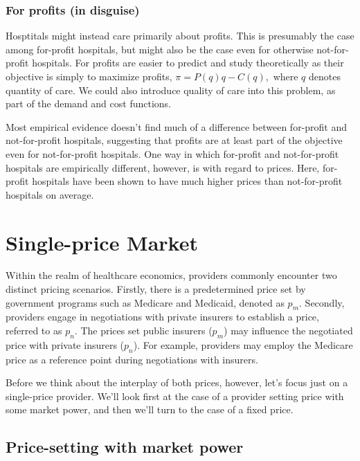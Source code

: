 \documentclass[
  letterpaper,
  DIV=11,
  numbers=noendperiod]{scrreport}
\theoremstyle{definition}
\theoremstyle{remark}
\begin{document}
\hypertarget{for-profits-in-disguise}{%
\subsection*{For profits (in disguise)}\label{for-profits-in-disguise}}

Hosptitals might instead care primarily about profits. This is
presumably the case among for-profit hospitals, but might also be the
case even for otherwise not-for-profit hospitals. For profits are easier
to predict and study theoretically as their objective is simply to
maximize profits, \(\pi=P(q)q - C(q),\) where \(q\) denotes quantity of
care. We could also introduce quality of care into this problem, as part
of the demand and cost functions.

Most empirical evidence doesn't find much of a difference between
for-profit and not-for-profit hospitals, suggesting that profits are at
least part of the objective even for not-for-profit hospitals. One way
in which for-profit and not-for-profit hospitals are empirically
different, however, is with regard to prices. Here, for-profit hospitals
have been shown to have much higher prices than not-for-profit hospitals
on average.

\hypertarget{single-price-market}{%
\chapter{Single-price Market}\label{single-price-market}}

Within the realm of healthcare economics, providers commonly encounter
two distinct pricing scenarios. Firstly, there is a predetermined price
set by government programs such as Medicare and Medicaid, denoted as
\(p_m\). Secondly, providers engage in negotiations with private
insurers to establish a price, referred to as \(p_n\). The prices set
public insurers (\(p_m\)) may influence the negotiated price with
private insurers (\(p_n\)). For example, providers may employ the
Medicare price as a reference point during negotiations with insurers.

Before we think about the interplay of both prices, however, let's focus
just on a single-price provider. We'll look first at the case of a
provider setting price with some market power, and then we'll turn to
the case of a fixed price.

\hypertarget{price-setting-with-market-power}{%
\section{Price-setting with market
power}\label{price-setting-with-market-power}}
\end{document}

